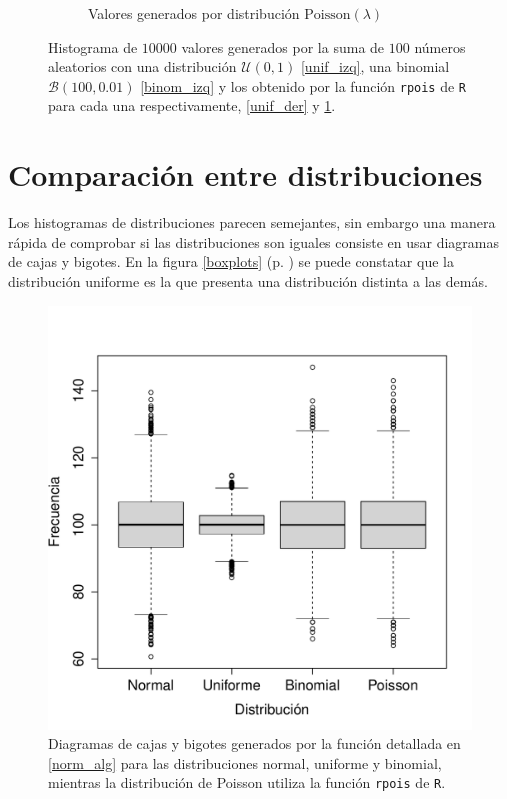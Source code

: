 \documentclass[paper=leter, fontsize=11pt]{scrartcl}
\numberwithin{equation}{section}		%
\numberwithin{figure}{section}			%
\numberwithin{table}{section}				%
\begin{document}
\begin{figure}
\begin{subfigure}{0.5\textwidth}
        \caption{Valores generados por distribución $\text{Poisson}(\lambda)$}
        \label{binom_der}
    \end{subfigure}
    \caption{Histograma de $10000$ valores generados por la suma de $100$ números aleatorios con una distribución $\mathcal{U}(0, 1)$ \ref{unif_izq}, una binomial $\mathcal{B}(100, 0.01)$ \ref{binom_izq} y los obtenido por la función \texttt{rpois} de \texttt{R}  para cada una respectivamente, \ref{unif_der} y \ref{binom_der}.}
    \label{unif}
\end{figure}

\section{Comparación entre distribuciones}

Los histogramas de distribuciones parecen semejantes, sin embargo una manera rápida de comprobar si las distribuciones son iguales consiste en usar diagramas de cajas y bigotes. En la figura \ref{boxplots} (p. \pageref{boxplots}) se puede constatar que la distribución uniforme es la que presenta una distribución distinta a las demás.

\begin{figure}
    \centering
    \includegraphics[width=1\textwidth]{boxplots.pdf}
    \caption{Diagramas de cajas y bigotes generados por la función detallada en \ref{norm_alg} para las distribuciones normal, uniforme y binomial, mientras la distribución de Poisson utiliza la función \texttt{rpois} de \texttt{R}.}
    \label{poisson}
\end{figure}



\end{document}
